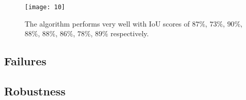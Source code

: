 \documentclass{article}  %
\begin{document}
	
	
	\begin{figure}[H]
		\centering
		\texttt{[image: 10]}
		\caption{The algorithm performs very well with IoU scores of $87\%$, $73\%$, $90\%$, $88\%$, $88\%$, $86\%$, $78\%$, $89\%$ respectively.}
	\end{figure}
	
	\subsection{Failures}
	
	\subsection{Robustness}
	
\end{document}

